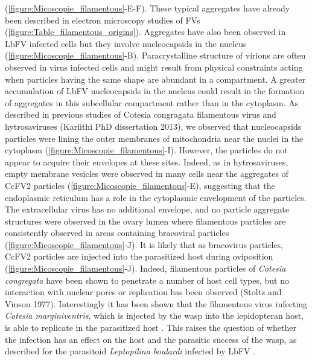 (\figurename{\ref{figure:Micoscopie_filamentous}}-E-F). These typical aggregates have already been described in electron microscopy studies of FVs (\figurename{\ref{figure:Table_filamentous_origins}}). Aggregates have also been observed in LbFV infected cells but they involve nucleocapsids in the nucleus (\figurename{\ref{figure:Micoscopie_filamentous}}-B).  Paracrystalline structure of virions are often observed in virus infected cells and might result from physical constraints acting when particles having the same shape are abundant in a compartment. A greater accumulation of LbFV nucleocapsids in the nucleus could result in the formation of aggregates in this subcellular compartment rather than in the cytoplasm. As described in previous studies of Cotesia congragata filamentous virus \citep{de_buron_characterization_1992} and hytrosaviruses (Kariithi PhD dissertation 2013), we observed that nucleocapsids particles were lining the outer membranes of mitochondria near the nuclei in the cytoplasm (\figurename{\ref{figure:Micoscopie_filamentous}}-I). However, the particles do not appear to acquire their envelopes at these sites. Indeed, as in hytrosaviruses, empty membrane vesicles were observed in many cells near the aggregates of CcFV2 particles (\figurename{\ref{figure:Micoscopie_filamentous}}-E), suggesting that the endoplasmic reticulum has a role in the cytoplasmic envelopment of the particles. The extracellular virus has no additional envelope, and no particle aggregate structures were observed in the ovary lumen where filamentous particles are consistently observed in areas containing bracoviral particles (\figurename{\ref{figure:Micoscopie_filamentous}}-J). It is likely that as bracovirus particles, CcFV2 particles are injected into the parasitized host during oviposition (\figurename{\ref{figure:Micoscopie_filamentous}}-J). Indeed, filamentous particles of \textit{Cotesia congregata} have been shown to penetrate a number of host cell types, but no interaction with nuclear pores or replication has been observed  (Stoltz and Vinson 1977). Interestingly it has been shown that the filamentous virus infecting \textit{Cotesia marginiventris}, which is injected by the wasp into the lepidopteran host, is able to replicate in the parasitized host \citep{styer_new_1987}. This raises the question of whether the infection has an effect on the host and the parasitic success of the wasp, as   described for the parasitoid  \textit{Leptopilina boulardi} infected by LbFV \citep{martinez_influence_2012}. 


